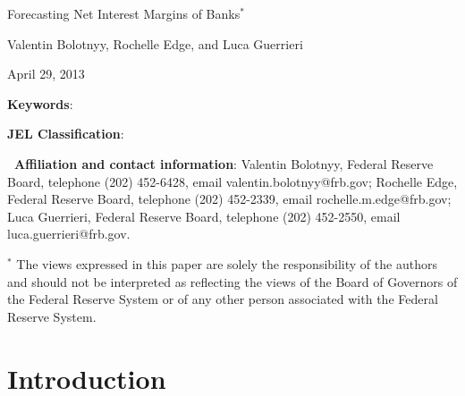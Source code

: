 \documentclass[12pt]{article}
\renewcommand{\baselinestretch}{1.5}
\begin{document}
\bigskip

\bigskip

\clearpage

\renewcommand{\baselinestretch}{1.0}

\begin{center}
{\normalsize \thispagestyle{empty} }

{\normalsize \medskip }

{\normalsize {\Large Forecasting Net Interest Margins of Banks$^{*}$%
} \medskip }

{\normalsize \bigskip \bigskip }

{\normalsize Valentin Bolotnyy, Rochelle Edge, and Luca Guerrieri }

{\normalsize \bigskip \bigskip }

{\normalsize April 29, 2013 }

{\normalsize \bigskip }
\end{center}

{\normalsize \bigskip }

\abstract{}

{\normalsize \vspace{3.0cm} }

{\normalsize \noindent \textbf{Keywords}:  \vspace{1cm} }

{\normalsize \noindent \textbf{JEL Classification}:  }

{\normalsize \vspace{2cm} }

\renewcommand{\baselinestretch}{1} \footnotesize \noindent

\textbf{\ Affiliation and contact information}: Valentin Bolotnyy,
Federal Reserve Board, telephone (202) 452-6428, email
valentin.bolotnyy@frb.gov; Rochelle Edge, Federal Reserve Board, telephone (202) 452-2339, email
rochelle.m.edge@frb.gov; Luca Guerrieri, Federal Reserve Board,
telephone (202) 452-2550, email luca.guerrieri@frb.gov.

\vspace{2cm}

{\footnotesize \noindent $^{*}$ The views expressed in this paper are solely
the responsibility of the authors and should not be interpreted as
reflecting the views of the Board of Governors of the Federal Reserve System
or of any other person associated with the Federal Reserve System.}

\clearpage \renewcommand{\baselinestretch}{1.5} \normalsize

\section{Introduction}
\end{document}
